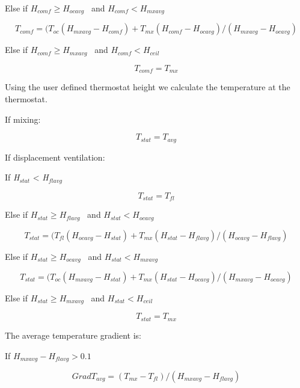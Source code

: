 Else if \({H_{comf}} \ge {H_{ocavg}}\) ~and \({H_{comf}} < {H_{mxavg}}\)

\begin{equation}
{T_{comf}} = ({T_{oc}}({H_{mxavg}} - {H_{comf}}) + {T_{mx}}({H_{comf}} - {H_{ocavg}})/({H_{mxavg}} - {H_{ocavg}})
\end{equation}

Else if \({H_{comf}} \ge {H_{mxavg}}\) ~and \({H_{comf}} < {H_{ceil}}\)

\begin{equation}
{T_{comf}} = {T_{mx}}
\end{equation}

Using the user defined thermostat height we calculate the temperature at the thermostat.

If mixing:

\begin{equation}
{T_{stat}} = {T_{avg}}
\end{equation}

If displacement ventilation:

If \emph{H\(_{stat}\)} \textless{} \emph{H\(_{flavg}\)}

\begin{equation}
{T_{stat}} = {T_{fl}}
\end{equation}

Else if \({H_{stat}} \ge {H_{flavg}}\) ~and \({H_{stat}} < {H_{ocavg}}\)

\begin{equation}
{T_{stat}} = ({T_{fl}}({H_{ocavg}} - {H_{stat}}) + {T_{mx}}({H_{stat}} - {H_{flavg}})/({H_{ocavg}} - {H_{flavg}})
\end{equation}

Else if \({H_{stat}} \ge {H_{ocavg}}\) ~and \({H_{stat}} < {H_{mxavg}}\)

\begin{equation}
{T_{stat}} = ({T_{oc}}({H_{mxavg}} - {H_{stat}}) + {T_{mx}}({H_{stat}} - {H_{ocavg}})/({H_{mxavg}} - {H_{ocavg}})
\end{equation}

Else if \({H_{stat}} \ge {H_{mxavg}}\) ~and \({H_{stat}} < {H_{ceil}}\)

\begin{equation}
{T_{stat}} = {T_{mx}}
\end{equation}

The average temperature gradient is:

If \({H_{mxavg}} - {H_{flavg}} > 0.1\)

\begin{equation}
Grad{T_{avg}} = ({T_{mx}} - {T_{fl}})/({H_{mxavg}} - {H_{flavg}})
\end{equation}

